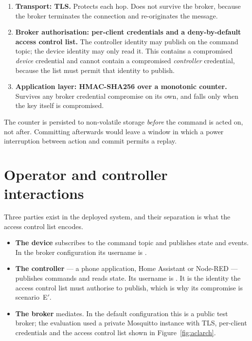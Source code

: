 \begin{enumerate}[leftmargin=1.8em,itemsep=5pt]
  \item \textbf{Transport: TLS.} Protects each hop. Does not survive the broker, because the
        broker terminates the connection and re-originates the message.
  \item \textbf{Broker authorisation: per-client credentials and a deny-by-default access
        control list.} The controller identity may publish on the command topic; the device
        identity may only read it. This contains a compromised \emph{device} credential and
        cannot contain a compromised \emph{controller} credential, because the list must permit
        that identity to publish.
  \item \textbf{Application layer: HMAC-SHA256 over a monotonic counter.} Survives any broker
        credential compromise on its own, and falls only when the key itself is compromised.
\end{enumerate}

The counter is persisted to non-volatile storage \emph{before} the command is acted on, not
after. Committing afterwards would leave a window in which a power interruption between action
and commit permits a replay.

\section{Operator and controller interactions}

Three parties exist in the deployed system, and their separation is what the access control list
encodes.

\begin{itemize}[leftmargin=1.6em,itemsep=4pt]
  \item \textbf{The device} subscribes to the command topic and publishes state and events. In
        the broker configuration its username is .
  \item \textbf{The controller} — a phone application, Home Assistant or Node-RED — publishes
        commands and reads state. Its username is . It is the identity the access
        control list must authorise to publish, which is why its compromise is scenario~E$'$.
  \item \textbf{The broker} mediates. In the default configuration this is a public test broker;
        the evaluation used a private Mosquitto instance with TLS, per-client credentials and
        the access control list shown in Figure~\ref{fig:aclarch}.
\end{itemize}

